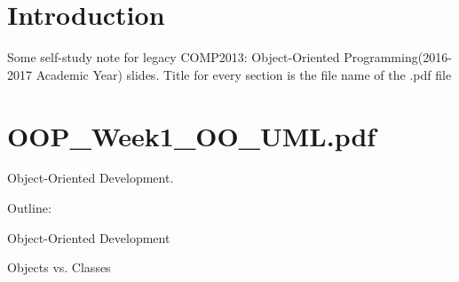 \documentclass[12pt,oneside,a4paper]{article}
\begin{document}
\maketitle

\section*{Introduction}
Some self-study note for legacy COMP2013: Object-Oriented Programming(2016-2017 Academic Year) slides. Title for every section is the file name of the .pdf file

\tableofcontents
\newpage

\section{OOP\_Week1\_OO\_UML.pdf}\label{week1}
Object-Oriented Development.
\begin{outline}
        Outline:
        \item {Object-Oriented Development}
        \item {Objects vs. Classes}
\end{outline}
\end{document}
